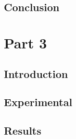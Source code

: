 \documentclass[a4paper, 11pt]{article}
\begin{document}
    \subsection{Conclusion}






\section{Part 3}
    \subsection{Introduction}




    \subsection{Experimental}




    \subsection{Results}


        
\end{document}
